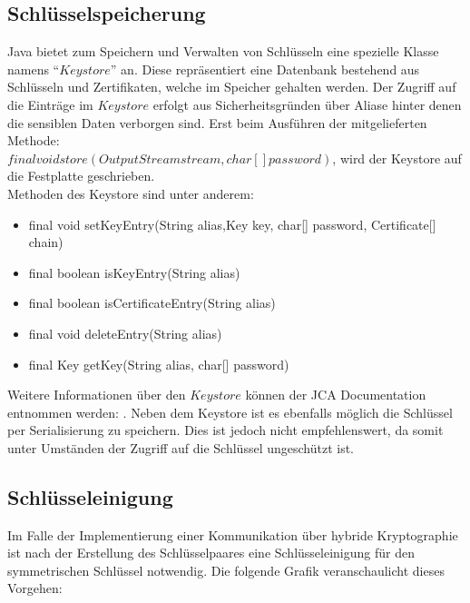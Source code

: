 \documentclass[paper=a4,11pt,german]{scrartcl} %
\begin{document}
\subsection{Schlüsselspeicherung}
Java bietet zum Speichern und Verwalten von Schlüsseln eine spezielle Klasse namens ``$Keystore$'' an. Diese repräsentiert eine Datenbank bestehend aus Schlüsseln und Zertifikaten, welche im Speicher gehalten werden. Der Zugriff auf die Einträge im $Keystore$ erfolgt aus Sicherheitsgründen über Aliase hinter denen die sensiblen Daten verborgen sind. Erst beim Ausführen der mitgelieferten Methode: \\$final void store(OutputStream stream, char[] password)$, wird der Keystore auf die Festplatte geschrieben.\\
Methoden des Keystore sind unter anderem:
\begin{itemize}
\item final void setKeyEntry(String alias,Key key,
                       char[] password,
                       Certificate[] chain)
\item final boolean isKeyEntry(String alias)
\item final boolean isCertificateEntry(String alias)
\item final void deleteEntry(String alias)
\item final Key getKey(String alias, char[] password)
\end{itemize}
Weitere Informationen über den $Keystore$ können der JCA Documentation entnommen werden: \cite{JCAdoc} .
Neben dem Keystore ist es ebenfalls möglich die Schlüssel per Serialisierung zu speichern. Dies ist jedoch nicht empfehlenswert, da somit unter Umständen der Zugriff auf die Schlüssel ungeschützt ist.
 
\subsection{Schlüsseleinigung}
Im Falle der Implementierung einer Kommunikation über hybride Kryptographie ist nach der Erstellung des Schlüsselpaares eine Schlüsseleinigung für den symmetrischen Schlüssel notwendig. Die folgende Grafik veranschaulicht dieses Vorgehen:
\end{document}
